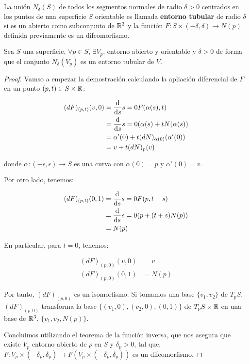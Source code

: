 \begin{definition}
La unión $N_\delta(S)$ de todos los segmentos normales de radio $\delta > 0$ centrados en los puntos de una superficie $S$ orientable es llamada \textbf{entorno tubular} de radio $\delta$ si es un abierto como subconjunto de $\mathbb{R}^3$ y la función $F: S \times (-\delta, \delta) \longrightarrow N(p)$ definida previamente es un difeomorfismo.
\end{definition}

\begin{lemma}
Sea $S$ una superficie, $\forall p \in S$, $\exists V_p$, entorno abierto y orientable y $\delta > 0$ de forma que el conjunto $N_\delta(V_p)$ es un entorno tubular de $V$.
\end{lemma}
\begin{proof}
Vamso a empezar la demostración calculando la apliación diferencial de $F$ en un punto $(p,t) \in S \times \mathbb{R}$:

\begin{align*}
    (dF)_{(p,t)}(v,0) &= \diff{}{s}{s=0} F(\alpha(s), t) \\
    &= \diff{}{s}{s=0} (\alpha(s) + tN(\alpha(s)) \\
    &= \alpha'(0) + t(dN)_{\alpha(0)}(\alpha'(0)) \\
    &= v + t(dN)_p(v)
\end{align*}

donde $\alpha: (-\epsilon, \epsilon) \longrightarrow S$ es una curva con $\alpha(0) = p$ y $\alpha'(0) = v$.

Por otro lado, tenemos:

\begin{align*}
    (dF)_{(p,t)}(0,1) &= \diff{}{s}{s=0} F(p, t+s) \\
    &= \diff{}{s}{s=0} (p + (t+s)N(p)) \\ &= N(p)
\end{align*}

En particular, para $t=0$, tenemos:

\begin{align*}
    (dF)_{(p,0)}(v,0) &= v \\
    (dF)_{(p,0)}(0,1) &= N(p)
\end{align*}

Por tanto, $(dF)_{(p,0)}$ es un isomorfismo. Si tomamos una base $\{v_1,v_2\}$ de $T_pS$, $(dF)_{(p,0)}$ transforma la base $\{(v_1,0),(v_2,0),(0,1)\}$ de $T_pS \times \mathbb{R}$ en una base de $\mathbb{R}^3$, $\{v_1,v_2,N(p)\}$.

Concluimos utilizando el teorema de la función inversa, que nos asegura que existe $V_p$ entorno abierto de $p$ en $S$ y $\delta_p > 0$, tal que, $F: V_p \times (-\delta_p, \delta_p) \longrightarrow F(V_p \times (-\delta_p, \delta_p))$ es un difeomorfismo.
\end{proof}

